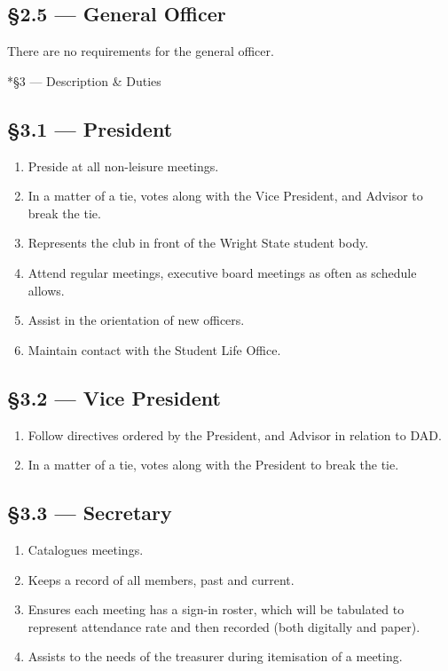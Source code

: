 \documentclass[11pt]{report}
\makeatletter
\renewcommand{\section}{\@startsection{subsection}{2}{0mm}{-\baselineskip}{0.5\baselineskip}{\normalfont\large\bf}}
\makeatother
\begin{document}
	\subsection*{\S2.5 --- General Officer}
	There are no requirements for the general officer.
	
	\section*{\S3 --- Description \& Duties}
	
	\subsection*{\S3.1 --- President}
	\begin{enumerate}
		\item Preside at all non-leisure meetings.
		\item In a matter of a tie, votes along with the Vice President, and Advisor to break the tie.
		\item Represents the club in front of the Wright State student body.
		\item Attend regular meetings, executive board meetings as often as schedule allows.  
		\item Assist in the orientation of new officers.
		\item Maintain contact with the Student Life Office.  
	\end{enumerate}
	\subsection*{\S3.2 --- Vice President}
	\begin{enumerate}
		\item Follow directives ordered by the President, and Advisor in relation to DAD.
		\item In a matter of a tie, votes along with the President to break the tie.
	\end{enumerate}
	\subsection*{\S3.3 --- Secretary}
	\begin{enumerate}
		\item Catalogues meetings.
		\item Keeps a record of all members, past and current.
		\item Ensures each meeting has a sign-in roster, which will be tabulated to represent attendance rate and then recorded (both digitally and paper).
		\item Assists to the needs of the treasurer during itemisation of a meeting.
	\end{enumerate}
	
\end{document}
